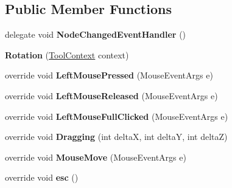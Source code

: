 \subsection*{Public Member Functions}
\begin{DoxyCompactItemize}
\item 
\hypertarget{class_interface_graphique_1_1_tools_1_1_rotation_a250629383cc2d9ae10cf56e6fdd1c8ed}{}delegate void {\bfseries Node\+Changed\+Event\+Handler} ()\label{class_interface_graphique_1_1_tools_1_1_rotation_a250629383cc2d9ae10cf56e6fdd1c8ed}

\item 
\hypertarget{class_interface_graphique_1_1_tools_1_1_rotation_ae04222491ac92fdfc494a6f794bfbb9a}{}{\bfseries Rotation} (\hyperlink{class_interface_graphique_1_1_tools_1_1_tool_context}{Tool\+Context} context)\label{class_interface_graphique_1_1_tools_1_1_rotation_ae04222491ac92fdfc494a6f794bfbb9a}

\item 
\hypertarget{class_interface_graphique_1_1_tools_1_1_rotation_aade19712f68677d50299f598245bced2}{}override void {\bfseries Left\+Mouse\+Pressed} (Mouse\+Event\+Args e)\label{class_interface_graphique_1_1_tools_1_1_rotation_aade19712f68677d50299f598245bced2}

\item 
\hypertarget{class_interface_graphique_1_1_tools_1_1_rotation_a012cd3e91e09356e2ec1a7914ec83b77}{}override void {\bfseries Left\+Mouse\+Released} (Mouse\+Event\+Args e)\label{class_interface_graphique_1_1_tools_1_1_rotation_a012cd3e91e09356e2ec1a7914ec83b77}

\item 
\hypertarget{class_interface_graphique_1_1_tools_1_1_rotation_a6f39a2956e6a6b1d493e1908e08f1fda}{}override void {\bfseries Left\+Mouse\+Full\+Clicked} (Mouse\+Event\+Args e)\label{class_interface_graphique_1_1_tools_1_1_rotation_a6f39a2956e6a6b1d493e1908e08f1fda}

\item 
\hypertarget{class_interface_graphique_1_1_tools_1_1_rotation_a3ab72aad0c7d78fad3e7544ef67bffd7}{}override void {\bfseries Dragging} (int delta\+X, int delta\+Y, int delta\+Z)\label{class_interface_graphique_1_1_tools_1_1_rotation_a3ab72aad0c7d78fad3e7544ef67bffd7}

\item 
\hypertarget{class_interface_graphique_1_1_tools_1_1_rotation_a756456f57a12c3e9b9606d9b63023f0f}{}override void {\bfseries Mouse\+Move} (Mouse\+Event\+Args e)\label{class_interface_graphique_1_1_tools_1_1_rotation_a756456f57a12c3e9b9606d9b63023f0f}

\item 
\hypertarget{class_interface_graphique_1_1_tools_1_1_rotation_af190de2985cd4d21d334df52df8d48d4}{}override void {\bfseries esc} ()\label{class_interface_graphique_1_1_tools_1_1_rotation_af190de2985cd4d21d334df52df8d48d4}

\end{DoxyCompactItemize}
